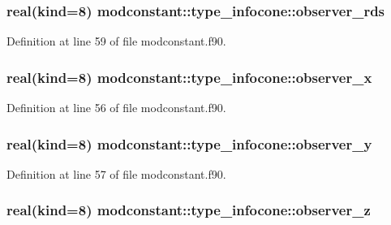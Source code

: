 \subsubsection[{\texorpdfstring{observer\+\_\+rds}{observer_rds}}]{\setlength{\rightskip}{0pt plus 5cm}real(kind=8) modconstant\+::type\+\_\+infocone\+::observer\+\_\+rds}\hypertarget{structmodconstant_1_1type__infocone_a5ce5f0baded3372b6802b32a689cf571}{}\label{structmodconstant_1_1type__infocone_a5ce5f0baded3372b6802b32a689cf571}


Definition at line 59 of file modconstant.\+f90.

\subsubsection[{\texorpdfstring{observer\+\_\+x}{observer_x}}]{\setlength{\rightskip}{0pt plus 5cm}real(kind=8) modconstant\+::type\+\_\+infocone\+::observer\+\_\+x}\hypertarget{structmodconstant_1_1type__infocone_af67a9e1949f9edead87e1c7bce004c5c}{}\label{structmodconstant_1_1type__infocone_af67a9e1949f9edead87e1c7bce004c5c}


Definition at line 56 of file modconstant.\+f90.

\subsubsection[{\texorpdfstring{observer\+\_\+y}{observer_y}}]{\setlength{\rightskip}{0pt plus 5cm}real(kind=8) modconstant\+::type\+\_\+infocone\+::observer\+\_\+y}\hypertarget{structmodconstant_1_1type__infocone_a2b4f02168657948cb408c35f98263029}{}\label{structmodconstant_1_1type__infocone_a2b4f02168657948cb408c35f98263029}


Definition at line 57 of file modconstant.\+f90.

\subsubsection[{\texorpdfstring{observer\+\_\+z}{observer_z}}]{\setlength{\rightskip}{0pt plus 5cm}real(kind=8) modconstant\+::type\+\_\+infocone\+::observer\+\_\+z}\hypertarget{structmodconstant_1_1type__infocone_a05bd00def00e396390e75c97d9e171b8}{}\label{structmodconstant_1_1type__infocone_a05bd00def00e396390e75c97d9e171b8}


